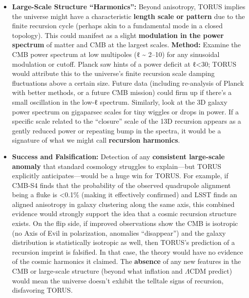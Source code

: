 \documentclass[]{article}
\begin{document}
\begin{itemize}
\begin{itemize}
{    ``hot/cold'' spots and the pattern of matter distribution} if both
    are influenced by the same recursion geometry​. For instance, the
    plane along which the CMB quadrupole is weakest might be the plane
    dividing a slightly higher-density half of the local universe from a
    lower-density half​. If analyses find that the CMB's weird features
    have a counterpart in galaxy data (a very specific, unlikely
    coincidence under random isotropy), that would strongly point to a
    common cause like TORUS's toroidal universe model​.
  \item
    \textbf{Large-Scale Structure ``Harmonics'':} Beyond anisotropy,
    TORUS implies the universe might have a characteristic
    \textbf{length scale or pattern} due to the finite recursion cycle
    (perhaps akin to a fundamental mode in a closed topology). This
    could manifest as a slight \textbf{modulation in the power spectrum}
    of matter and CMB at the largest scales. \textbf{Method:} Examine
    the CMB power spectrum at low multipoles (ℓ \textasciitilde{} 2--10)
    for any sinusoidal modulation or cutoff. Planck saw hints of a power
    deficit at ℓ\textless{}30; TORUS would attribute this to the
    universe's finite recursion scale damping fluctuations above a
    certain size​. Future data (including re-analysis of Planck with
    better methods, or a future CMB mission) could firm up if there's a
    small oscillation in the low-ℓ spectrum. Similarly, look at the 3D
    galaxy power spectrum on gigaparsec scales for tiny wiggles or drops
    in power. If a specific scale related to the ``closure'' scale of
    the 13D recursion appears as a gently reduced power or repeating
    bump in the spectra, it would be a signature of what we might call
    \textbf{recursion harmonics}​.
  \item
    \textbf{Success and Falsification:} Detection of any
    \textbf{consistent large-scale anomaly} that standard cosmology
    struggles to explain---but TORUS explicitly anticipates---would be a
    huge win for TORUS. For example, if CMB-S4 finds that the
    probability of the observed quadrupole alignment being a fluke is
    \textless{}0.1\% (making it effectively confirmed) and LSST finds an
    aligned anisotropy in galaxy clustering along the same axis, this
    combined evidence would strongly support the idea that a cosmic
    recursion structure exists​. On the flip side, if improved
    observations show the CMB is isotropic (no Axis of Evil in
    polarization, anomalies ``disappear'') and the galaxy distribution
    is statistically isotropic as well, then TORUS's prediction of a
    recursion imprint is falsified​. In that case, the theory would have
    no evidence of the cosmic harmonics it claimed. The \textbf{absence}
    of any new features in the CMB or large-scale structure (beyond what
    inflation and $\Lambda$CDM predict) would mean the universe doesn't exhibit
    the telltale signs of recursion, disfavoring TORUS.
  \end{itemize}
\end{itemize}
\end{document}
